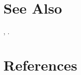 




\section{See Also} %
\label{sec:rbaFilterBank_see_also}
\texttt{}, \quad \texttt{}.


\section{References} %
\label{sec:rbaFilterBank_references}



